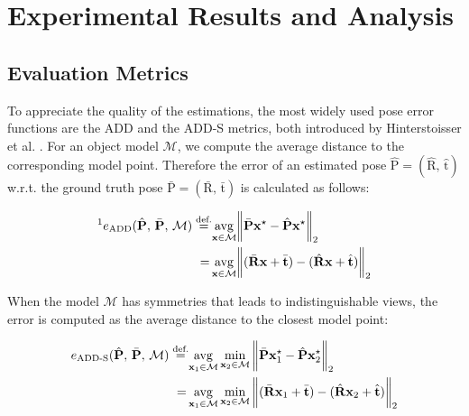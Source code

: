 
\chapter{Experimental Results and Analysis}\label{chapter:presentation_of_the_results}

\section{Evaluation Metrics}

To appreciate the quality of the estimations, the most widely used pose error functions are the \ac{ADD} and the \ac{ADD-S} metrics, both introduced by Hinterstoisser et al. \cite{10.1007/978-3-642-37331-2_42}. For an object model $\mathcal{M}$, we compute the average distance to the corresponding model point. Therefore the error of an estimated pose $\hat{\bm{\mathrm{P}}}=(\hat{\bm{\mathrm{R}}},\,\hat{\bm{\mathrm{t}}})$ w.r.t. the ground truth pose $\bar{\bm{\mathrm{P}}}=(\bar{\bm{\mathrm{R}}},\,\bar{\bm{\mathrm{t}}})$ is calculated as follows:

\begin{align}
	\textit{\footnotemark}e_\mathrm{ADD}(\hat{\bm{\mathrm{P}}},\,\bar{\bm{\mathrm{P}}},\,\mathcal{M})\stackrel{\text{def.}}{=}&\underset{\bm{\mathrm{x}}\in\mathcal{M}}{\mathrm{avg}}\norm\bigg{\bar{\bm{\mathrm{P}}}\bm{\mathrm{x}}^\star-\hat{\bm{\mathrm{P}}}\bm{\mathrm{x}}^\star}_2 \\
	=\,&\underset{\bm{\mathrm{x}}\in\mathcal{M}}{\mathrm{avg}}\norm\bigg{(\bar{\bm{\mathrm{R}}}\bm{\mathrm{x}}+\bar{\bm{\mathrm{t}}})-(\hat{\bm{\mathrm{R}}}\bm{\mathrm{x}}+\hat{\bm{\mathrm{t}}})}_2
\end{align}

\noindent When the model $\mathcal{M}$ has symmetries that leads to indistinguishable views, the error is computed as the average distance to the closest model point:
 
\begin{align}
	e_{\mathrm{ADD}\text{-}\mathrm{S}}(\hat{\bm{\mathrm{P}}},\,\bar{\bm{\mathrm{P}}},\,\mathcal{M})\stackrel{\text{def.}}{=}&\underset{\bm{\mathrm{x}}_1\in\mathcal{M}}{\mathrm{avg}}\min\limits_{\bm{\mathrm{x}}_2\in\mathcal{M}}\norm\bigg{\bar{\bm{\mathrm{P}}}\bm{\mathrm{x}}_1^\star-\hat{\bm{\mathrm{P}}}\bm{\mathrm{x}}_2^\star}_2 \\
	=\,&\underset{\bm{\mathrm{x}}_1\in\mathcal{M}}{\mathrm{avg}}\min\limits_{\bm{\mathrm{x}}_2\in\mathcal{M}}\norm\bigg{(\bar{\bm{\mathrm{R}}}\bm{\mathrm{x}}_1+\bar{\bm{\mathrm{t}}})-(\hat{\bm{\mathrm{R}}}\bm{\mathrm{x}}_2+\hat{\bm{\mathrm{t}}})}_2
\end{align}

